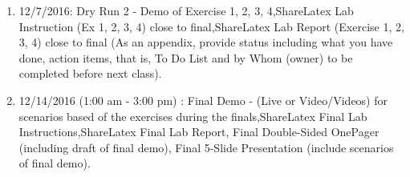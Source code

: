 \documentclass[main.tex]{subfiles}
\begin{document}
\begin{enumerate}
\item 12/7/2016: Dry Run 2 - Demo of Exercise 1, 2, 3, 4,ShareLatex Lab Instruction (Ex 1, 2, 3, 4) close to final,ShareLatex Lab Report (Exercise 1, 2, 3, 4) close to final (As an appendix, provide status including what you have done, action items, that is, To Do List and by Whom (owner) to be completed before next class).

\item 12/14/2016 (1:00 am - 3:00 pm) : Final Demo -  (Live or Video/Videos) for scenarios based of the exercises during the finals,ShareLatex Final Lab Instructions,ShareLatex Final Lab Report, Final Double-Sided OnePager (including draft of final demo), Final 5-Slide Presentation (include scenarios of final demo).
\end{enumerate}

\newpage
\end{document}
